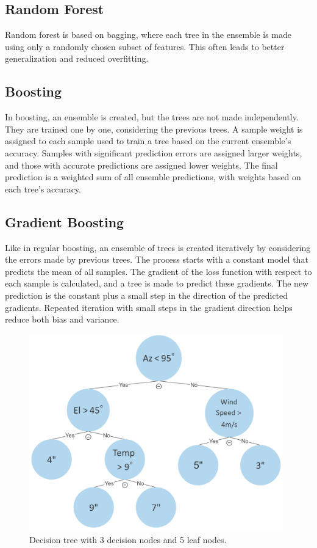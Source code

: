 \subsection{Random Forest}
Random forest is based on bagging, where each tree in the ensemble is made using only a randomly chosen subset of features.
This often leads to better generalization and reduced overfitting.

\subsection{Boosting}
In boosting, an ensemble is created, but the trees are not made independently.
They are trained one by one, considering the previous trees.
A sample weight is assigned to each sample used to train a tree based on the current ensemble's accuracy.
Samples with significant prediction errors are assigned larger weights, and those with accurate predictions are assigned lower weights.
The final prediction is a weighted sum of all ensemble predictions, with weights based on each tree's accuracy.

\subsection{Gradient Boosting}
Like in regular boosting, an ensemble of trees is created iteratively by considering the errors made by previous trees.
The process starts with a constant model that predicts the mean of all samples.
The gradient of the loss function with respect to each sample is calculated, and a tree is made to predict these gradients.
The new prediction is the constant plus a small step in the direction of the predicted gradients.
Repeated iteration with small steps in the gradient direction helps reduce both bias and variance.




\begin{figure}[H]
    \centering
    \includegraphics[width=0.98\textwidth]{Other figures/decisiontree_example.PNG}
    \caption{Decision tree with 3 decision nodes and 5 leaf nodes.}
    \label{fig:decitiontree}
\end{figure}

